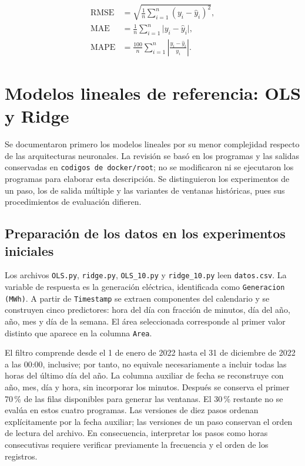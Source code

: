 \begin{align}
\mathrm{RMSE} &= \sqrt{\frac{1}{n}\sum_{i=1}^{n}(y_i-\hat{y}_i)^2},\\
\mathrm{MAE} &= \frac{1}{n}\sum_{i=1}^{n}\lvert y_i-\hat{y}_i\rvert,\\
\mathrm{MAPE} &= \frac{100}{n}\sum_{i=1}^{n}\left\lvert\frac{y_i-\hat{y}_i}{y_i}\right\rvert.
\end{align}

\section{Modelos lineales de referencia: OLS y Ridge}
\label{sec:metodo-lineales}

Se documentaron primero los modelos lineales por su menor complejidad respecto de las arquitecturas neuronales. La revisión se basó en los programas y las salidas conservadas en \texttt{codigos de docker/root}; no se modificaron ni se ejecutaron los programas para elaborar esta descripción. Se distinguieron los experimentos de un paso, los de salida múltiple y las variantes de ventanas históricas, pues sus procedimientos de evaluación difieren.

\subsection{Preparación de los datos en los experimentos iniciales}

Los archivos \texttt{OLS.py}, \texttt{ridge.py}, \texttt{OLS\_10.py} y \texttt{ridge\_10.py} leen \texttt{datos.csv}. La variable de respuesta es la generación eléctrica, identificada como \texttt{Generacion (MWh)}. A partir de \texttt{Timestamp} se extraen componentes del calendario y se construyen cinco predictores: hora del día con fracción de minutos, día del año, año, mes y día de la semana. El área seleccionada corresponde al primer valor distinto que aparece en la columna \texttt{Area}.

El filtro comprende desde el 1 de enero de 2022 hasta el 31 de diciembre de 2022 a las 00:00, inclusive; por tanto, no equivale necesariamente a incluir todas las horas del último día del año. La columna auxiliar de fecha se reconstruye con año, mes, día y hora, sin incorporar los minutos. Después se conserva el primer 70\,\% de las filas disponibles para generar las ventanas. El 30\,\% restante no se evalúa en estos cuatro programas. Las versiones de diez pasos ordenan explícitamente por la fecha auxiliar; las versiones de un paso conservan el orden de lectura del archivo. En consecuencia, interpretar los pasos como horas consecutivas requiere verificar previamente la frecuencia y el orden de los registros.

